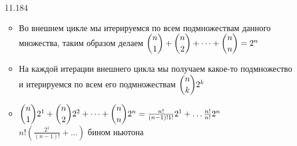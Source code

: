 \documentclass{article}
\begin{document}
\begin{enumerate}
    \item [11.184]
    \begin{itemize}
        \item Во внешнем цикле мы итерируемся по всем подмножествам данного множества, таким образом делаем 
        $\dbinom{n}{1} + \dbinom{n}{2} + \dots +\dbinom{n}{n} = 2^{n}$
        \item На каждой итерации внешнего цикла мы получаем какое-то подмножество и итерируемся по всем его подмножествам
        $\dbinom{n}{k} 2^{k}$
        \item 
        $\dbinom{n}{1}2^{1} + \dbinom{n}{2}2^{2} + \dots +\dbinom{n}{n}2^{n} = \frac{n!}{(n - 1)! 1!}2^{1} + \dots \frac{n!}{n!}2^{n}$ \\
        $n! (\frac{2^{1}}{(n - 1)!} + \dots )$ бином ньютона
    \end{itemize}


\end{enumerate}
\end{document}
